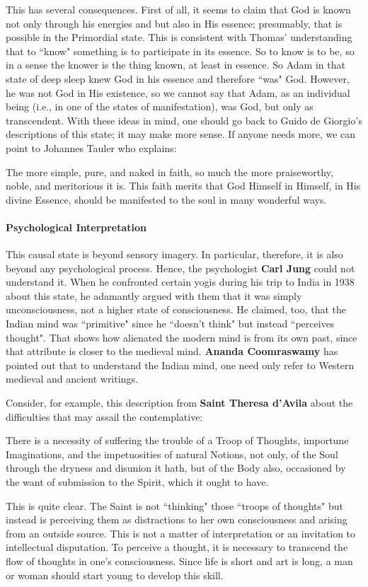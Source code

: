 This has several consequences. First of all, it seems to claim that God is known not only through his energies and but also in His essence; presumably, that is possible in the Primordial state. This is consistent with Thomas' understanding that to ``know" something is to participate in its essence. So to know is to be, so in a sense the knower is the thing known, at least in essence. So Adam in that state of deep sleep knew God in his essence and therefore ``was" God. However, he was not God in His existence, so we cannot say that Adam, as an individual being (i.e., in one of the states of manifestation), was God, but only as transcendent. With these ideas in mind, one should go back to Guido de Giorgio's descriptions of this state; it may make more sense. If anyone needs more, we can point to Johannes Tauler who explains:

\begin{quotex}
The more simple, pure, and naked in faith, so much the more praiseworthy, noble, and meritorious it is. This faith merits that God Himself in Himself, in His divine Essence, should be manifested to the soul in many wonderful ways.

\end{quotex}
\paragraph{Psychological Interpretation}
This causal state is beyond sensory imagery. In particular, therefore, it is also beyond any psychological process. Hence, the psychologist \textbf{Carl Jung} could not understand it. When he confronted certain yogis during his trip to India in 1938 about this state, he adamantly argued with them that it was simply unconsciousness, not a higher state of consciousness. He claimed, too, that the Indian mind was ``primitive" since he ``doesn't think" but instead ``perceives thought". That shows how alienated the modern mind is from its own past, since that attribute is closer to the medieval mind. \textbf{Ananda Coomraswamy} has pointed out that to understand the Indian mind, one need only refer to Western medieval and ancient writings.

Consider, for example, this description from \textbf{Saint Theresa d'Avila} about the difficulties that may assail the contemplative:

\begin{quotex}
There is a necessity of suffering the trouble of a Troop of Thoughts, importune Imaginations, and the impetuosities of natural Notions, not only, of the Soul through the dryness and disunion it hath, but of the Body also, occasioned by the want of submission to the Spirit, which it ought to have.

\end{quotex}
This is quite clear. The Saint is not ``thinking" those ``troops of thoughts" but instead is perceiving them as distractions to her own consciousness and arising from an outside source. This is not a matter of interpretation or an invitation to intellectual disputation. To perceive a thought, it is necessary to transcend the flow of thoughts in one's consciousness. Since life is short and art is long, a man or woman should start young to develop this skill.

